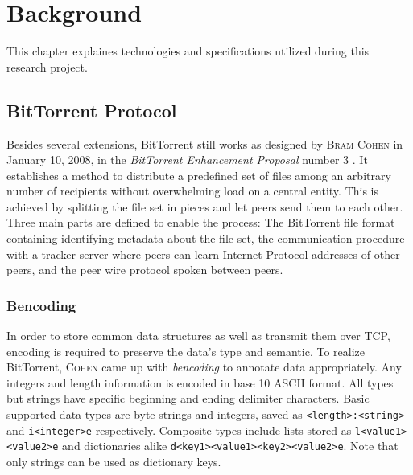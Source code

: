 \documentclass[10pt, a4paper, twoside, headsepline]{scrbook}
\renewcommand{\_}{\origunderscore\allowbreak}
\begin{document}
\chapter{Background}
This chapter explaines technologies and specifications utilized during this research project.

\section{BitTorrent Protocol}
Besides several extensions, BitTorrent still works as designed by \textsc{Bram Cohen} in January 10, 2008, in the \emph{BitTorrent Enhancement Proposal} number 3 \cite{bep3}. It establishes a method to distribute a predefined set of files among an arbitrary number of recipients without overwhelming load on a central entity. This is achieved by splitting the file set in pieces and let peers send them to each other. Three main parts are defined to enable the process: The BitTorrent file format containing identifying metadata about the file set, the communication procedure with a tracker server where peers can learn Internet Protocol addresses of other peers, and the peer wire protocol spoken between peers.

\subsection{Bencoding}
In order to store common data structures as well as transmit them over TCP, encoding is required to preserve the data's type and semantic. To realize BitTorrent, \textsc{Cohen} came up with \emph{bencoding} to annotate data appropriately. Any integers and length information is encoded in base 10 ASCII format. All types but strings have specific beginning and ending delimiter characters. Basic supported data types are byte strings and integers, saved as \texttt{<length>:<string>} and \texttt{i<integer>e} respectively. Composite types include lists stored as \texttt{l<value1><value2>e} and dictionaries alike \texttt{d<key1><value1><key2><value2>e}. Note that only strings can be used as dictionary keys.
\end{document}
